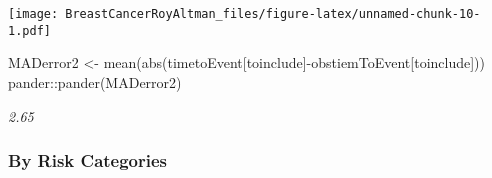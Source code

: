 \documentclass[
]{article}
\newenvironment{Shaded}{\begin{snugshade}}{\end{snugshade}}
\newcommand{\FunctionTok}[1]{\textcolor[rgb]{0.00,0.00,0.00}{#1}}
\newcommand{\NormalTok}[1]{#1}
\newcommand{\OtherTok}[1]{\textcolor[rgb]{0.56,0.35,0.01}{#1}}
\newcommand{\SpecialCharTok}[1]{\textcolor[rgb]{0.00,0.00,0.00}{#1}}
\begin{document}
\texttt{[image: BreastCancerRoyAltman\_files/figure-latex/unnamed-chunk-10-1.pdf]}

\begin{Shaded}
\begin{Highlighting}[]
\NormalTok{MADerror2 }\OtherTok{\textless{}{-}} \FunctionTok{mean}\NormalTok{(}\FunctionTok{abs}\NormalTok{(timetoEvent[toinclude]}\SpecialCharTok{{-}}\NormalTok{obstiemToEvent[toinclude]))}
\NormalTok{pander}\SpecialCharTok{::}\FunctionTok{pander}\NormalTok{(MADerror2)}
\end{Highlighting}
\end{Shaded}

\emph{2.65}

\hypertarget{by-risk-categories-1}{%
\subsubsection{By Risk Categories}\label{by-risk-categories-1}}
\end{document}
